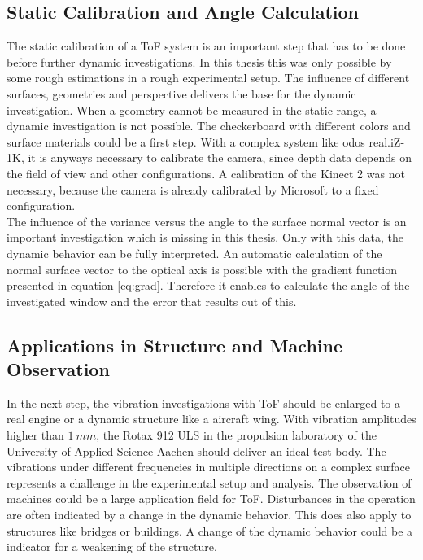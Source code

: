 \subsection{Static Calibration and Angle Calculation}
The static calibration of a ToF system is an important step that has to be done before further dynamic investigations. In this thesis this was only possible by some rough estimations in a rough experimental setup. The influence of different surfaces, geometries and perspective delivers the base for the dynamic investigation. When a geometry cannot be measured in the static range, a dynamic investigation is not possible. The checkerboard with different colors and surface materials could be a first step. With a complex system like odos real.iZ-1K, it is anyways necessary to calibrate the camera, since depth data depends on the field of view and other configurations. A calibration of the Kinect 2 was not necessary, because the camera is already calibrated by Microsoft to a fixed configuration.\\ 

The influence of the variance versus the angle to the surface normal vector is an important investigation which is missing in this thesis. Only with this data, the dynamic behavior can be fully interpreted. An automatic calculation of the normal surface vector to the optical axis is possible with the gradient function presented in equation \ref{eq:grad}. Therefore it enables to calculate the angle of the investigated window and the error that results out of this.

\subsection{Applications in Structure and Machine Observation}
In the next step, the vibration investigations with ToF should be enlarged to a real engine or a dynamic structure like a aircraft wing. With vibration amplitudes higher than $1~mm$, the Rotax 912 ULS in the propulsion laboratory of the University of Applied Science Aachen should deliver an ideal test body. The vibrations under different frequencies in multiple directions on a complex surface represents a challenge in the experimental setup and analysis. The observation of machines could be a large application field for ToF. Disturbances in the operation are often indicated by a change in the dynamic behavior. This does also apply to structures like bridges or buildings. A change of the dynamic behavior could be a indicator for a weakening of the structure. 
 
